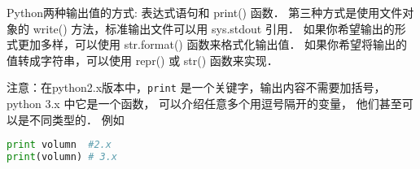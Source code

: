 
Python两种输出值的方式: 表达式语句和 print() 函数．
第三种方式是使用文件对象的 write() 方法，标准输出文件可以用 sys.stdout 引用．
如果你希望输出的形式更加多样，可以使用 str.format() 函数来格式化输出值．
如果你希望将输出的值转成字符串，可以使用 repr() 或 str() 函数来实现．

注意：在python2.x版本中，\verb|print| 是一个关键字，输出内容不需要加括号， python 3.x 中它是一个函数， 可以介绍任意多个用逗号隔开的变量， 他们甚至可以是不同类型的． 例如
\begin{lstlisting}[language=python]
print volumn  #2.x
print(volumn) # 3.x
\end{lstlisting}
